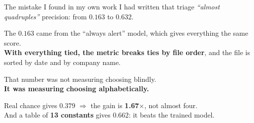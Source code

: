 \documentclass[aspectratio=169]{beamer}
\begin{document}
\begin{frame}{The mistake I found in my own work}
I had written that triage \emph{``almost quadruples''} precision: from $0.163$ to $0.632$.
\vspace{3mm}

The $0.163$ came from the ``always alert'' model, which gives everything the same score.\\
\textbf{With everything tied, the metric breaks ties by file order}, and the file is sorted by
date and by company name.
\vspace{3mm}
\begin{center}
\large That number was not measuring choosing blindly.\\
\textbf{It was measuring choosing alphabetically.}
\end{center}
\vspace{3mm}
\footnotesize
Real chance gives $0.379$ $\Rightarrow$ the gain is \textbf{1.67$\times$}, not almost four.\\
And a table of \textbf{13 constants} gives $0.662$: it beats the trained model.
\end{frame}
\end{document}

